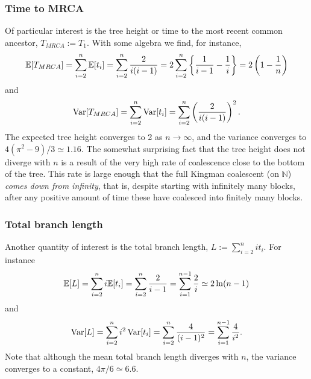 
\subsubsection{Time to MRCA}
Of particular interest is the tree height or time to the most recent common ancestor, $T_{MRCA} := T_1$.
With some algebra we find, for instance,
\begin{equation}
\mathbb{E}[ T_{MRCA} ] 
= \sum_{i=2}^{n} \mathbb{E}[t_i]
= \sum_{i=2}^n \frac{2}{i(i-1)}
= 2 \sum_{i=2}^n \left\{ \frac{1}{i-1} - \frac{1}{i} \right\}
= 2 \left( 1 - \frac{1}{n} \right)
\end{equation}
and
\begin{equation}
\operatorname{Var}[ T_{MRCA} ] 
= \sum_{i=2}^n \operatorname{Var}[t_i]
= \sum_{i=2}^n \left( \frac{2}{i(i-1)} \right)^2 .
\end{equation}
The expected tree height converges to 2 as $n\to\infty$, and the variance converges to $4(\pi^2 - 9)/3 \simeq 1.16$.
The somewhat surprising fact that the tree height does not diverge with $n$ is a result of the very high rate of coalescence close to the bottom of the tree. This rate is large enough that the full Kingman coalescent (on $\mathbb{N}$) \emph{comes down from infinity}, that is, despite starting with infinitely many blocks, after any positive amount of time these have coalesced into finitely many blocks.


\subsubsection{Total branch length}
Another quantity of interest is the total branch length,
$ L := \sum_{i=2}^n i t_i $.
For instance
\begin{equation}
\E[ L ] 
= \sum_{i=2}^n i \E[ t_i ]
= \sum_{i=2}^n \frac{2}{i-1}
= \sum_{i=1}^{n-1} \frac{2}{i} %
\simeq 2 \ln(n-1) 
\end{equation}
and
\begin{equation}
\operatorname{Var}[ L ] 
= \sum_{i=2}^n i^2 \operatorname{Var}[ t_i ]
= \sum_{i=2}^n \frac{4}{(i-1)^2}
= \sum_{i=1}^{n-1} \frac{4}{i^2} .
\end{equation}
Note that although the mean total branch length diverges with $n$, the variance converges to a constant, $4\pi /6 \simeq 6.6$.



